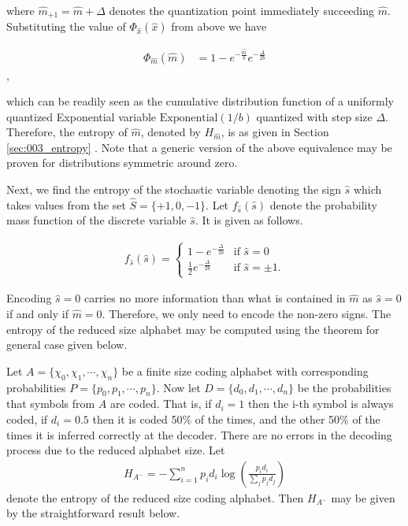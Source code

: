 where $\hat{m}_{+1} = \hat{m} + \Delta$ denotes the quantization point immediately succeeding $\hat{m}$. Substituting the value of $\Phi_{\hat{x}}(\hat{x})$ from above we have

\begin{align}\Phi_{\hat{m}}(\hat{m}) &= 1 - e^{-\frac{\hat{m}}{b}} e^{-\frac{\Delta}{2b}}\end{align},

which can be readily seen as the cumulative distribution function of a uniformly quantized Exponential variable $\text{Exponential}(1/b)$ quantized with step size $\Delta$. Therefore, the entropy of $\hat{m}$, denoted by $H_{\hat{m}}$, is as given in Section \ref{sec:003_entropy} . Note that a generic version of the above equivalence may be proven for distributions symmetric around zero.

Next, we find the entropy of the stochastic variable denoting the sign $\hat{s}$ which takes values from the set $\hat{S} = \{+1, 0, -1\}$. Let $f_{\hat{s}}(\hat{s})$ denote the probability mass function of the discrete variable $\hat{s}$. It is given as follows.

\begin{align}f_{\hat{s}}(\hat{s}) = \begin{cases}1 - e^{-\frac{\Delta}{2b}} & \text{if $\hat{s} = 0$}\\ \frac{1}{2} e^{-\frac{\Delta}{2b}} & \text{if $\hat{s} = \pm 1.$}\end{cases}\end{align}

Encoding $\hat{s} = 0$ carries no more information than what is contained in $\hat{m}$ as $\hat{s} = 0$ if and only if $\hat{m} = 0$. Therefore, we only need to encode the non-zero signs. The entropy of the reduced size alphabet may be computed using the theorem for general case given below.

Let $A = \{\chi_0, \chi_1, \cdots, \chi_n\}$ be a finite size coding alphabet with corresponding probabilities $P = \{p_0, p_1, \cdots, p_n\}$. Now let $D = \{d_0, d_1, \cdots, d_n\}$ be the probabilities that symbols from $A$ are coded. That is, if $d_i = 1$ then the i-th symbol is always coded, if $d_i = 0.5$ then it is coded 50\% of the times, and the other 50\% of the times it is inferred correctly at the decoder. There are no errors in the decoding process due to the reduced alphabet size. Let 
\begin{align}H_{A^{-}} = -\sum_{i = 1}^{n} p_i d_i \log \left( \frac{p_i d_i}{\sum_{j} p_j d_j} \right)\end{align}
denote the entropy of the reduced size coding alphabet. Then $H_{A^{-}}$ may be given by the straightforward result below.

